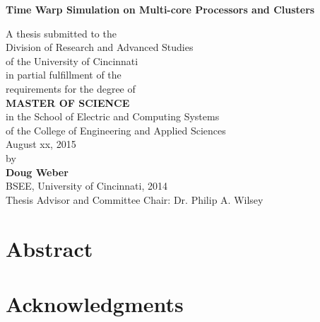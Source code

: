 \documentclass[11pt]{book}
\begin{document}
\thispagestyle{empty}

\doublespacing

\vspace*{0.5in}

\begin{center}
\LARGE{\textbf{Time Warp Simulation on Multi-core Processors and Clusters}}

\vspace*{0.4in}

  {\large A thesis submitted to the\\[0.20in]
    Division of Research and Advanced Studies\\
    of the University of Cincinnati\\[0.20in]
    in partial fulfillment of the\\
    requirements for the degree of\\[0.20in]
    \textbf{MASTER OF SCIENCE}\\[0.20in]
    in the School of Electric and Computing Systems\\
    of the College of Engineering and Applied Sciences\\[0.20in]
    August xx, 2015\\[0.20in]
    by\\[0.20in]
    \textbf{Doug Weber}\\
    BSEE, University of Cincinnati, 2014\\}
  \vspace{0.5in}
  {\large Thesis Advisor and Committee Chair:  Dr. Philip A. Wilsey}
\end{center}

\clearpage

\setcounter{page}{1}
\clearpage

\chapter*{Abstract}




\chapter*{Acknowledgments}
\end{document}

